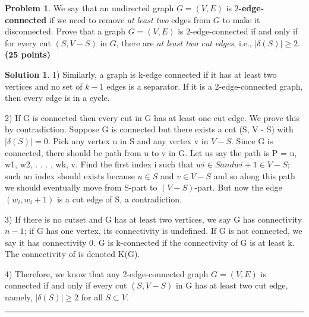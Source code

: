 \documentclass{article}
\theoremstyle{definition}
\newtheorem{problem}{Problem}
\def\fline{\rule{0.75\linewidth}{0.5pt}}
\newcommand{\finishline}{\begin{center}\fline\end{center}}
\newtheorem*{solution*}{Solution}
\newenvironment{solution}{\begin{solution*}}{{\finishline} \end{solution*}}
\newcommand{\grade}[1]{\hfill{\textbf{($\mathbf{#1}$ points)}}}
\begin{document}
\begin{problem}
	We say that an undirected graph $G=(V,E)$ is \textbf{$2$-edge-connected} if we need to remove \emph{at least two} edges from $G$ to make it disconnected. Prove that a 
	graph $G=(V,E)$ is $2$-edge-connected if and only if for every cut $(S,V-S)$ in $G$, there are \emph{at least two cut edges}, i.e., $|{\delta(S)}| \geq 2$. \grade{25}
\end{problem}


\medskip

\begin{solution}

	1) Similarly, a graph is k-edge connected if it has at least two vertices and no set of $k-1$ edges is a separator. If it is a 2-edge-connected graph, then every edge is in a cycle. 
	
	2) If G is connected then every cut in G has at least one cut edge. We prove this by contradiction. Suppose G is connected but there exists a cut (S, V - S) with $|\delta(S)| = 0$. Pick any vertex u in S and any vertex v in $V-S$. Since G is connected, there should be path from u to v in G. Let us say the path is P = u, w1, w2, . . . , wk, v. Find the first index i such that $wi \in S and wi+1 \in V - S$; such an index should exists because $u \in S$ and $v \in V - S$ and so along this path we should eventually move from S-part to $(V - S)$-part. But now the edge $(w_i, w_i+1)$ is a cut edge of S, a contradiction. 

	3) If there is no cutset and G has at least two vertices, we say G has connectivity $n-1$; if G has one vertex, its connectivity is undefined. If G is not connected, we say it has connectivity 0. G is k-connected if the connectivity of G is at least k. The connectivity of is denoted K(G). 

	4) Therefore, we know that any 2-edge-connected graph $G=(V,E)$ is connected if and only if every cut $(S,V-S)$ in G has at least two cut edge, namely, $|{\delta(S)}| \geq 2$ for all $S \subset V$. \\
	
\end{solution}


\medskip
\end{document}
